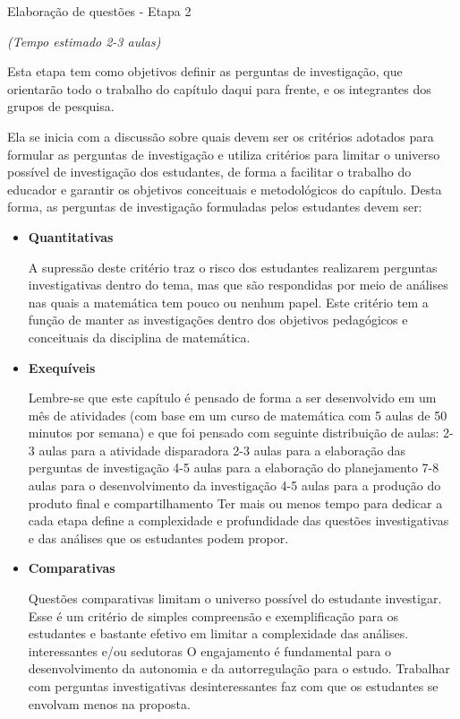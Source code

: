 \clearpage
\def\currentcolor{session1}
\begin{paginatexto}{Elaboração de questões - Etapa 2}
{
\textit{(Tempo estimado 2-3 aulas)}

Esta etapa tem como objetivos definir as perguntas de investigação, que orientarão todo o trabalho do capítulo daqui para frente, e os integrantes dos grupos de pesquisa. 

Ela se inicia com a discussão sobre quais devem ser os critérios adotados para formular as perguntas de investigação e utiliza critérios para limitar o universo possível de investigação dos estudantes, de forma a facilitar o trabalho do educador e garantir os objetivos conceituais e metodológicos do capítulo. Desta forma, as perguntas de investigação formuladas pelos estudantes devem ser:

\begin{itemize}
\item \textbf{Quantitativas}

A supressão deste critério traz o risco dos estudantes realizarem perguntas investigativas dentro do tema, mas que são respondidas por meio de análises nas quais a matemática tem pouco ou nenhum papel. Este critério tem a função de manter as investigações dentro dos objetivos pedagógicos e conceituais da disciplina de matemática. 

\item \textbf{Exequíveis} 

Lembre-se que este capítulo é pensado de forma a ser desenvolvido em um mês de atividades (com base em um curso de matemática com 5 aulas de 50 minutos por semana) e que foi pensado com seguinte distribuição de aulas: 
2-3 aulas para a atividade disparadora
2-3 aulas para a elaboração das perguntas de investigação
4-5 aulas para a elaboração do planejamento 
7-8 aulas para o desenvolvimento da investigação
4-5 aulas para a produção do produto final e compartilhamento
Ter mais ou menos tempo para dedicar a cada etapa define a complexidade e profundidade das questões investigativas e das análises que os estudantes podem propor.

\item \textbf{Comparativas}

Questões comparativas limitam o universo possível do estudante investigar. Esse é um critério de simples compreensão e exemplificação para os estudantes e bastante efetivo em limitar a complexidade das análises.
interessantes e/ou sedutoras
O engajamento é fundamental para o desenvolvimento da autonomia e da autorregulação para o estudo. Trabalhar com perguntas investigativas desinteressantes faz com que os estudantes se envolvam menos na proposta.


\end{itemize}}
\end{paginatexto}
